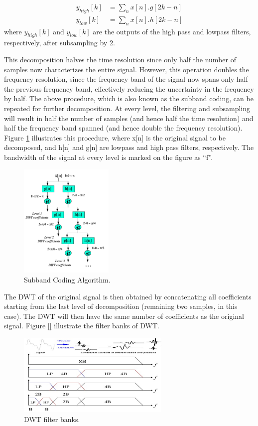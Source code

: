 \documentclass[12pt, a4paper, twoside]{report}
\begin{document}
\begin{align}
y_{high}[k] &= \sum_{n} x[n].g[2k-n] \\ 
y_{low}[k] &= \sum_{n} x[n].h[2k-n]
\end{align}
where $y_{high}[k]$ and $y_{low}[k]$ are the outputs of the high pass and lowpass filters, respectively, after subsampling by 2. 
\par
This decomposition halves the time resolution since only half the number of samples now characterizes the entire signal. However, this operation doubles the frequency resolution, since the frequency band of the signal now spans only half the previous frequency band, effectively reducing the uncertainty in the frequency by half. The above procedure, which is also known as the subband coding, can be repeated for further decomposition. At every level, the filtering and subsampling will result in half the number of samples (and hence half the time resolution) and half the frequency band spanned (and hence double the frequency resolution). Figure \ref{fig:subband-algorithm} illustrates this procedure, where x[n] is the original signal to be decomposed, and h[n] and g[n] are lowpass and high pass filters, respectively. The bandwidth of the signal at every level is marked on the figure as ``f''.
\begin{figure}[!h]
	\centering
	\includegraphics[width=0.4\textwidth]
	{images/chapter3/subband-algorithm}
	\caption{Subband Coding Algorithm.}
	\label{fig:subband-algorithm}
\end{figure}

The DWT of the original signal is then obtained by concatenating all coefficients starting from the last level of decomposition (remaining two samples, in this case). The DWT will then have the same number of coefficients as the original signal. Figure \ref{} illustrate the filter banks of DWT.
\begin{figure}[!h]
	\centering
	\includegraphics[width=0.65\textwidth]
	{images/chapter3/dwt-banks}
	\caption{DWT filter banks.}
	\label{fig:dwt-banks}
\end{figure}
\end{document}
